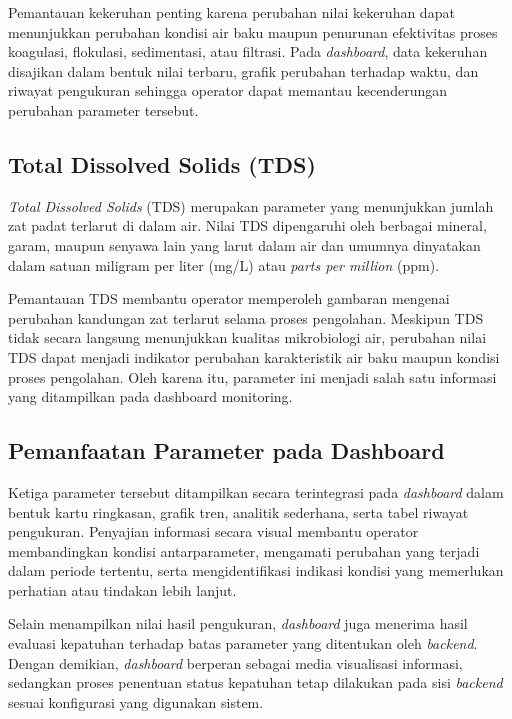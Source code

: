 Pemantauan kekeruhan penting karena perubahan nilai kekeruhan dapat menunjukkan
perubahan kondisi air baku maupun penurunan efektivitas proses koagulasi,
flokulasi, sedimentasi, atau filtrasi. Pada \textit{dashboard}, data kekeruhan disajikan
dalam bentuk nilai terbaru, grafik perubahan terhadap waktu, dan riwayat
pengukuran sehingga operator dapat memantau kecenderungan perubahan parameter
tersebut.

\subsection{Total Dissolved Solids (TDS)}

\textit{Total Dissolved Solids} (TDS) merupakan parameter yang menunjukkan
jumlah zat padat terlarut di dalam air. Nilai TDS dipengaruhi oleh berbagai
mineral, garam, maupun senyawa lain yang larut dalam air dan umumnya dinyatakan
dalam satuan miligram per liter (mg/L) atau \textit{parts per million} (ppm).

Pemantauan TDS membantu operator memperoleh gambaran mengenai perubahan
kandungan zat terlarut selama proses pengolahan. Meskipun TDS tidak secara
langsung menunjukkan kualitas mikrobiologi air, perubahan nilai TDS dapat
menjadi indikator perubahan karakteristik air baku maupun kondisi proses
pengolahan. Oleh karena itu, parameter ini menjadi salah satu informasi yang
ditampilkan pada dashboard monitoring.

\subsection{Pemanfaatan Parameter pada Dashboard}

Ketiga parameter tersebut ditampilkan secara terintegrasi pada
\textit{dashboard} dalam bentuk kartu ringkasan, grafik tren, analitik sederhana, serta
tabel riwayat pengukuran. Penyajian informasi secara visual membantu operator
membandingkan kondisi antarparameter, mengamati perubahan yang terjadi dalam
periode tertentu, serta mengidentifikasi indikasi kondisi yang memerlukan
perhatian atau tindakan lebih lanjut.

Selain menampilkan nilai hasil pengukuran, \textit{dashboard} juga menerima hasil evaluasi
kepatuhan terhadap batas parameter yang ditentukan oleh \textit{backend}. Dengan demikian,
\textit{dashboard} berperan sebagai media visualisasi informasi, sedangkan proses
penentuan status kepatuhan tetap dilakukan pada sisi \textit{backend} sesuai konfigurasi
yang digunakan sistem.

